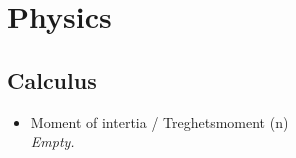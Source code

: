 \documentclass[12pt]{report}
\begin{document}
\chapter{Physics}
\section{Calculus}
\begin{itemize}{}
    \item Moment of intertia / Treghetsmoment (n) \\
    \textit{Empty.}

    

\end{itemize}



\printindex


\raggedright                    %
\sloppy
\printbibliography[heading=bibintoc,title={Bibliography}]
\end{document}
